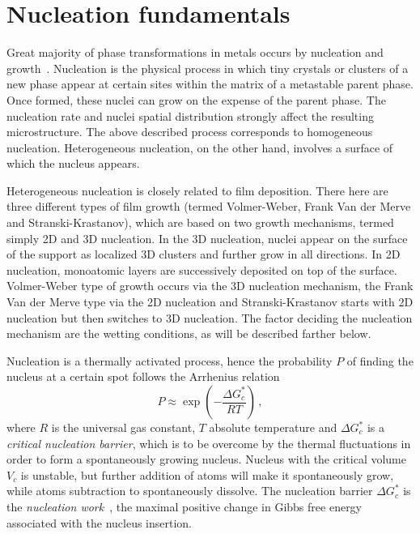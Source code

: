 \section{Nucleation fundamentals} \label{sec_Nucleation_fundamentals}
Great majority of phase transformations in metals occurs by nucleation and growth~\cite{Porter2009}. Nucleation is the physical process in which tiny crystals or clusters of a new phase appear at certain sites within the matrix of a metastable parent phase. Once formed, these nuclei can grow on the expense of the parent phase. The nucleation rate and nuclei spatial distribution strongly affect the resulting microstructure. The above described process corresponds to homogeneous nucleation. Heterogeneous nucleation, on the other hand, involves a surface of which the nucleus appears. 

Heterogeneous nucleation is closely related to film deposition. There here are three different types of film growth (termed Volmer-Weber, Frank Van der Merve and Stranski-Krastanov), which are based on two growth mechanisms, termed simply 2D and 3D nucleation. In the 3D nucleation, nuclei appear on the surface of the support as localized 3D clusters and further grow in all directions. In 2D nucleation, monoatomic layers are successively deposited on top of the surface. Volmer-Weber type of growth occurs via the 3D nucleation mechanism, the Frank Van der Merve type via the 2D nucleation and Stranski-Krastanov starts with 2D nucleation but then switches to 3D nucleation. The factor deciding the nucleation mechanism  are the wetting conditions, as will be described farther below. 

Nucleation is a thermally activated process, hence the probability $P$ of finding the nucleus at a certain spot follows the Arrhenius relation
\begin{equation}
	P \approx \exp\left(-\frac{\Delta G_c^*}{RT}\right) \,,
\end{equation}
where $R$ is the universal gas constant, $T$ absolute temperature and $\Delta G_c^*$ is a \textit{critical nucleation barrier}, which is to be overcome by the thermal fluctuations in order to form a spontaneously growing nucleus. Nucleus with the critical volume $V_c$ is unstable, but further addition of atoms will make it spontaneously grow, while atoms subtraction to spontaneously dissolve. The nucleation barrier $\Delta G_c^*$ is the \textit{nucleation work}~\cite{Milchev2002}, the maximal positive change in Gibbs free energy associated with the nucleus insertion.

